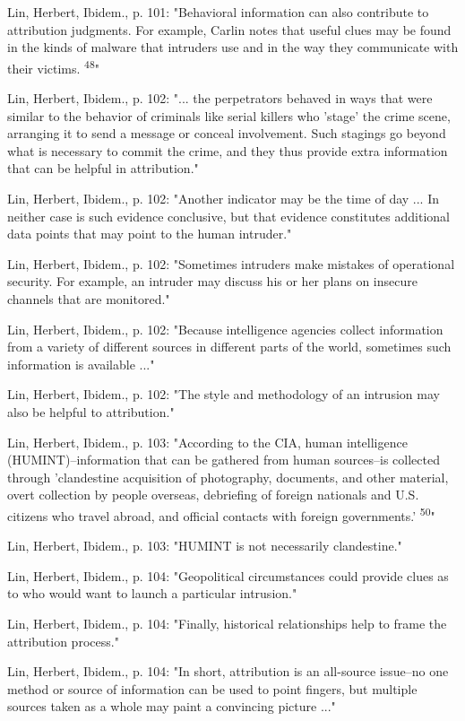 Lin, Herbert, Ibidem., p. 101: "Behavioral information can also contribute to attribution judgments. For example, Carlin notes that useful clues may be found in the kinds of \gls{malware} that intruders use and in the way they communicate with their victims. \textsuperscript{48}"

Lin, Herbert, Ibidem., p. 102: "... the perpetrators behaved in ways that were similar to the behavior of criminals like serial killers who 'stage' the crime scene, arranging it to send a message or conceal involvement. Such stagings go beyond what is necessary to commit the crime, and they thus provide extra information that can be helpful in attribution."

Lin, Herbert, Ibidem., p. 102: "Another indicator may be the time of day ... In neither case is such evidence conclusive, but that evidence constitutes additional data points that may point to the human intruder."

Lin, Herbert, Ibidem., p. 102: "Sometimes intruders make mistakes of operational security. For example, an intruder may discuss his or her plans on insecure channels that are monitored."

Lin, Herbert, Ibidem., p. 102: "Because intelligence agencies collect information from a variety of different sources in different parts of the world, sometimes such information is available ..."

Lin, Herbert, Ibidem., p. 102: "The style and methodology of an intrusion may also be helpful to attribution."

Lin, Herbert, Ibidem., p. 103: "According to the CIA, human intelligence (HUMINT)--information that can be gathered from human sources--is collected through 'clandestine acquisition of photography, documents, and other material, overt collection by people overseas, debriefing of foreign nationals and U.S. citizens who travel abroad, and official contacts with foreign governments.' \textsuperscript{50}"

Lin, Herbert, Ibidem., p. 103: "HUMINT is not necessarily clandestine."

Lin, Herbert, Ibidem., p. 104: "Geopolitical circumstances could provide clues as to who would want to launch a particular intrusion."

Lin, Herbert, Ibidem., p. 104: "Finally, historical relationships help to frame the attribution process."

Lin, Herbert, Ibidem., p. 104: "In short, attribution is an all-source issue--no one method or source of information can be used to point fingers, but multiple sources taken as a whole may paint a convincing picture ..."

